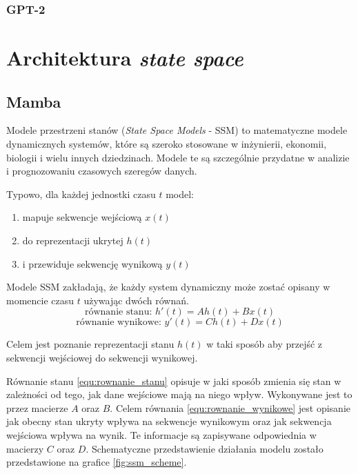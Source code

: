 \documentclass[data-science]{agh-wi} %
\begin{document}
\subsubsection*{GPT-2}\label{sec:gpt2}
\cite{gpt2}

\section{Architektura \textit{state space}}
\subsection{Mamba}

Modele przestrzeni stanów (\textit{State Space Models} - SSM) to matematyczne modele dynamicznych systemów, które są szeroko stosowane w inżynierii, ekonomii, biologii i wielu innych dziedzinach. Modele te są szczególnie przydatne w analizie i prognozowaniu czasowych szeregów danych.

Typowo, dla każdej jednostki czasu $t$ model:
\begin{enumerate}
    \item mapuje sekwencje wejściową $x(t)$
    \item do reprezentacji ukrytej $h(t)$
    \item i przewiduje sekwencję wynikową $y(t)$
\end{enumerate}

Modele SSM zakładają, że każdy system dynamiczny może zostać opisany w momencie czasu $t$ używając dwóch równań.
\begin{equation}
    \text{równanie stanu: }h'(t) = Ah(t) + Bx(t)
    \label{equ:rownanie_stanu}
\end{equation}
\begin{equation}
    \text{równanie wynikowe: }y'(t) = Ch(t) + Dx(t)
    \label{equ:rownanie_wynikowe}
\end{equation}

Celem jest poznanie reprezentacji stanu $h(t)$  w taki sposób aby przejść z sekwencji wejściowej do sekwencji wynikowej.

Równanie stanu \ref*{equ:rownanie_stanu} opisuje w jaki sposób zmienia się stan w zależności od tego, jak dane wejściowe mają na niego wpływ. Wykonywane jest to przez macierze $A$ oraz $B$. Celem równania \ref*{equ:rownanie_wynikowe} jest opisanie jak obecny stan ukryty wpływa na sekwencje wynikowym oraz jak sekwencja wejściowa wpływa na wynik. Te informacje są zapisywane odpowiednia w macierzy $C$ oraz $D$. Schematyczne przedstawienie działania modelu zostało przedstawione na grafice \ref*{fig:ssm_scheme}.
\end{document}
